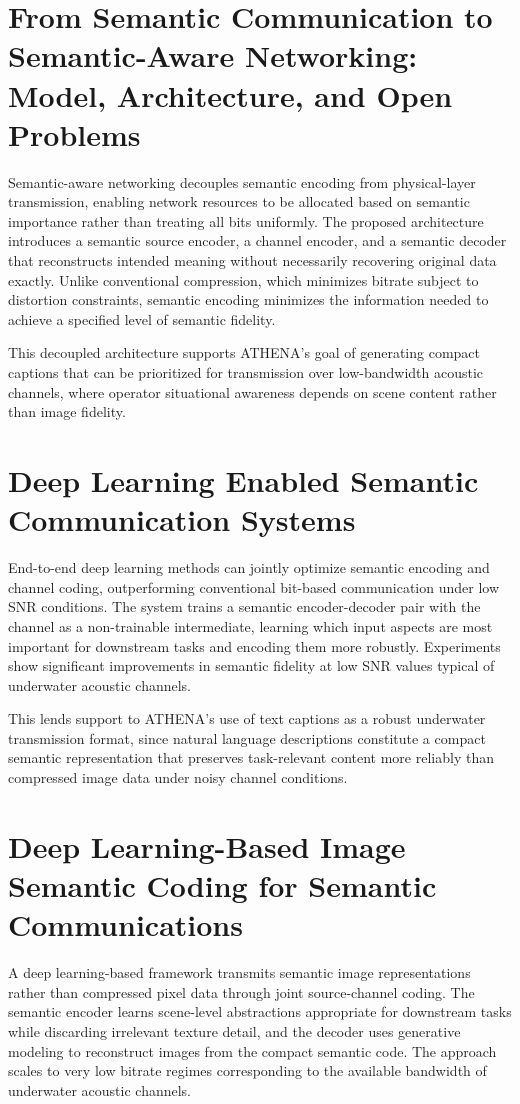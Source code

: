 \section[Shi, Xiao, Li \& Xie]{From Semantic Communication to Semantic-Aware Networking: Model, Architecture, and Open Problems~\cite{shi2021semantic}}
Semantic-aware networking decouples semantic encoding from physical-layer transmission, enabling network resources to be allocated based on semantic importance rather than treating all bits uniformly. The proposed architecture introduces a semantic source encoder, a channel encoder, and a semantic decoder that reconstructs intended meaning without necessarily recovering original data exactly. Unlike conventional compression, which minimizes bitrate subject to distortion constraints, semantic encoding minimizes the information needed to achieve a specified level of semantic fidelity.

This decoupled architecture supports ATHENA's goal of generating compact captions that can be prioritized for transmission over low-bandwidth acoustic channels, where operator situational awareness depends on scene content rather than image fidelity.

\section[Xie, Qin, Li \& Juang]{Deep Learning Enabled Semantic Communication Systems~\cite{xie2021deep}}
End-to-end deep learning methods can jointly optimize semantic encoding and channel coding, outperforming conventional bit-based communication under low SNR conditions. The system trains a semantic encoder-decoder pair with the channel as a non-trainable intermediate, learning which input aspects are most important for downstream tasks and encoding them more robustly. Experiments show significant improvements in semantic fidelity at low SNR values typical of underwater acoustic channels.

This lends support to ATHENA's use of text captions as a robust underwater transmission format, since natural language descriptions constitute a compact semantic representation that preserves task-relevant content more reliably than compressed image data under noisy channel conditions.

\section[Huang, Tao, Gao \& Lu]{Deep Learning-Based Image Semantic Coding for Semantic Communications~\cite{huang2021deep}}
A deep learning-based framework transmits semantic image representations rather than compressed pixel data through joint source-channel coding. The semantic encoder learns scene-level abstractions appropriate for downstream tasks while discarding irrelevant texture detail, and the decoder uses generative modeling to reconstruct images from the compact semantic code. The approach scales to very low bitrate regimes corresponding to the available bandwidth of underwater acoustic channels.

